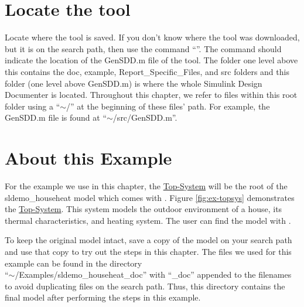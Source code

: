 \documentclass{mcscert}
\newcommand{\sddtool}{Simulink Design Documenter}
\newcommand{\topsystemnolink}{Top-System} %
\newcommand{\topsystem}{\hyperref[def:topsystem]{\topsystemnolink{}}}
\begin{document}
\section*{Locate the tool}
Locate where the tool is saved. If you don't know where the tool was downloaded, but it is on the search path, then use the command ``''. 
The command should indicate the location of the GenSDD.m file of the tool. 
The folder one level above this contains the doc, example, Report\_Specific\_Files, and src folders and this folder (one level above GenSDD.m) is where the whole \sddtool{} is located. 
Throughout this chapter, we refer to files within this root folder using a ``$\sim$/'' at the beginning of these files' path. 
For example, the GenSDD.m file is found at ``$\sim$/src/GenSDD.m''.

\section*{About this Example}
For the example we use in this chapter, the \topsystem{} will be the root of the 
sldemo\_househeat model which comes with \matlab{}. 
Figure \ref{fig:ex-topsys} demonstrates the \topsystem{}. 
This system models the outdoor environment of a house, its thermal characteristics, and heating system. 
The user can find the model with .

To keep the original model intact, save a copy of the model on your \matlab{} search path and use that copy to try out the steps in this chapter.
The files we used for this example can be found in the directory 
\\``$\sim$/Examples/sldemo\_househeat\_doc'' with ``\_doc'' appended to the 
filenames to avoid duplicating files on the search path. 
Thus, this directory contains the final model after performing the steps in this example. 
\end{document}
